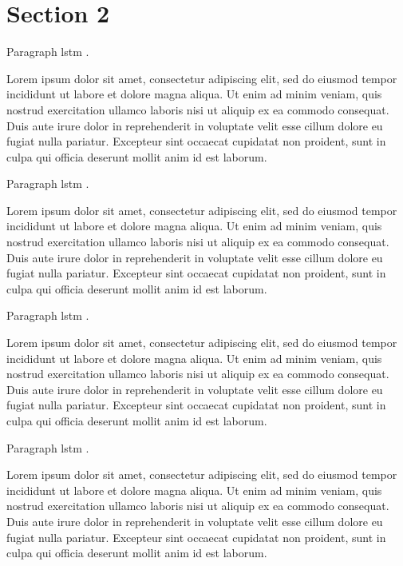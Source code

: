 \section{Section 2}

Paragraph
\gls{lstm} \cite{hochreiter1997lstm-1}
\cite{zeyer2018:asr-attention-1}.

Lorem ipsum dolor sit amet, consectetur adipiscing elit,
sed do eiusmod tempor incididunt ut labore et dolore magna aliqua.
Ut enim ad minim veniam, quis nostrud exercitation ullamco laboris nisi ut aliquip ex ea commodo consequat.
Duis aute irure dolor in reprehenderit in voluptate velit esse cillum dolore eu fugiat nulla pariatur.
Excepteur sint occaecat cupidatat non proident, sunt in culpa qui officia deserunt mollit anim id est laborum.

Paragraph
\gls{lstm} \cite{hochreiter1997lstm-2}
\cite{zeyer2018:asr-attention-2}.

Lorem ipsum dolor sit amet, consectetur adipiscing elit,
sed do eiusmod tempor incididunt ut labore et dolore magna aliqua.
Ut enim ad minim veniam, quis nostrud exercitation ullamco laboris nisi ut aliquip ex ea commodo consequat.
Duis aute irure dolor in reprehenderit in voluptate velit esse cillum dolore eu fugiat nulla pariatur.
Excepteur sint occaecat cupidatat non proident, sunt in culpa qui officia deserunt mollit anim id est laborum.

Paragraph
\gls{lstm} \cite{hochreiter1997lstm-3}
\cite{zeyer2018:asr-attention-3}.

Lorem ipsum dolor sit amet, consectetur adipiscing elit,
sed do eiusmod tempor incididunt ut labore et dolore magna aliqua.
Ut enim ad minim veniam, quis nostrud exercitation ullamco laboris nisi ut aliquip ex ea commodo consequat.
Duis aute irure dolor in reprehenderit in voluptate velit esse cillum dolore eu fugiat nulla pariatur.
Excepteur sint occaecat cupidatat non proident, sunt in culpa qui officia deserunt mollit anim id est laborum.

Paragraph
\gls{lstm} \cite{hochreiter1997lstm-4}
\cite{zeyer2018:asr-attention-4}.

Lorem ipsum dolor sit amet, consectetur adipiscing elit,
sed do eiusmod tempor incididunt ut labore et dolore magna aliqua.
Ut enim ad minim veniam, quis nostrud exercitation ullamco laboris nisi ut aliquip ex ea commodo consequat.
Duis aute irure dolor in reprehenderit in voluptate velit esse cillum dolore eu fugiat nulla pariatur.
Excepteur sint occaecat cupidatat non proident, sunt in culpa qui officia deserunt mollit anim id est laborum.

